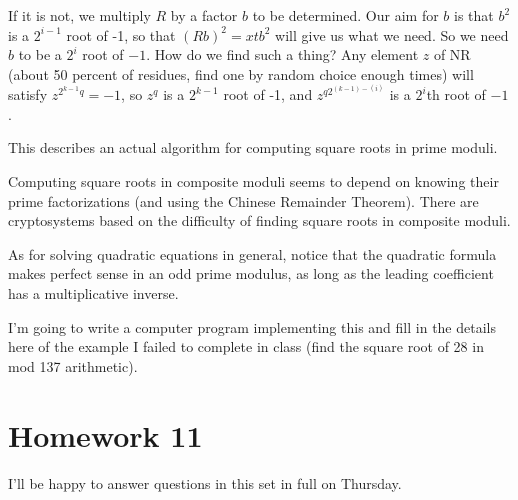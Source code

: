\documentclass[12pt]{article}
\begin{document}
If it is not, we multiply $R$ by a factor $b$ to be determined.  Our aim for $b$ is that $b^2$ is a $2^{i-1}$ root of -1,
so that  $(Rb)^2 = xtb^2$ will give us what we need.  So we need $b$ to be a $2^{i}$ root of $-1$.  How do we find
such a thing?  Any element $z$ of NR (about 50 percent of residues, find one by random choice enough times) will
satisfy $z^{2^{k-1}q} = -1$, so $z^q$ is a $2^{k-1}$ root of -1, and $z^{q2^{(k-1)-(i)}}$ is a $2^{i}$th root of $-1$.

This describes an actual algorithm for computing square roots in prime moduli.

Computing square roots in composite moduli seems to depend on knowing their prime factorizations (and using the Chinese Remainder Theorem).  There are cryptosystems based on the difficulty of finding square roots in composite moduli.

As for solving quadratic equations in general, notice that the quadratic formula makes perfect sense in an odd prime modulus, as long as the leading coefficient has a multiplicative inverse.

I'm going to write a computer program implementing this and fill in the details here of the example I failed to complete in class (find the square root of 28 in mod 137 arithmetic).


\section{Homework 11}

I'll be happy to answer questions in this set in full on Thursday.
\end{document}
